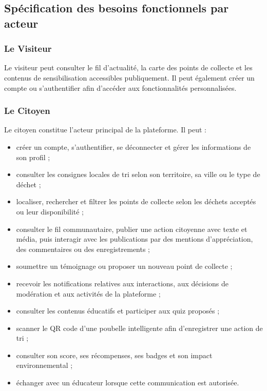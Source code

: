 \subsection{Spécification des besoins fonctionnels par acteur}
\label{subsec:besoins_fonctionnels}

\subsubsection{Le Visiteur}

Le visiteur peut consulter le fil d'actualité, la carte des points de collecte et les contenus de sensibilisation accessibles publiquement. Il peut également créer un compte ou s'authentifier afin d'accéder aux fonctionnalités personnalisées.

\subsubsection{Le Citoyen}

Le citoyen constitue l'acteur principal de la plateforme. Il peut :
\begin{itemize}
    \item créer un compte, s'authentifier, se déconnecter et gérer les informations de son profil ;
    \item consulter les consignes locales de tri selon son territoire, sa ville ou le type de déchet ;
    \item localiser, rechercher et filtrer les points de collecte selon les déchets acceptés ou leur disponibilité ;
    \item consulter le fil communautaire, publier une action citoyenne avec texte et média, puis interagir avec les publications par des mentions d'appréciation, des commentaires ou des enregistrements ;
    \item soumettre un témoignage ou proposer un nouveau point de collecte ;
    \item recevoir les notifications relatives aux interactions, aux décisions de modération et aux activités de la plateforme ;
    \item consulter les contenus éducatifs et participer aux quiz proposés ;
    \item scanner le QR code d'une poubelle intelligente afin d'enregistrer une action de tri ;
    \item consulter son score, ses récompenses, ses badges et son impact environnemental ;
    \item échanger avec un éducateur lorsque cette communication est autorisée.
\end{itemize}

